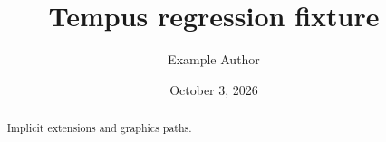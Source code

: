 \documentclass{tempusreport}
\title{Tempus regression fixture}
\author{Example Author}\date{October 3, 2026}
\begin{document}
\maketitle
\begin{abstract}Implicit extensions and graphics paths.\end{abstract}
\end{document}
